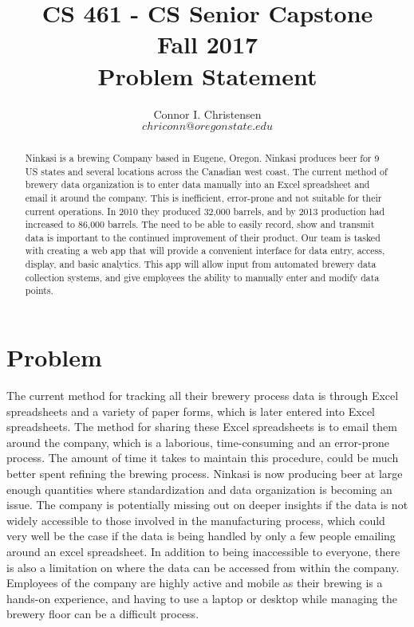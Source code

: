 \documentclass[draftclsnofoot,onecolumn,letterpaper,10pt]{IEEEtran}
\title{CS 461 - CS Senior Capstone
	\\Fall 2017
	\\Problem Statement
}
\author{Connor I. Christensen \\ \small{\(chriconn@oregonstate.edu\)}}
\begin{document}
\begin{titlingpage}
    \maketitle
    \begin{abstract}
	Ninkasi is a brewing Company based in Eugene, Oregon. Ninkasi produces beer for 9 US states and several locations across the Canadian west coast. The current method of brewery data organization is to enter data manually into an Excel spreadsheet and email it around the company. This is inefficient, error-prone and not suitable for their current operations. In 2010 they produced 32,000 barrels, and by 2013 production had increased to 86,000 barrels. The need to be able to easily record, show and transmit data is important to the continued improvement of their product. Our team is tasked with creating a web app that will provide a convenient interface for data entry, access, display, and basic analytics. This app will allow input from automated brewery data collection systems, and give employees the ability to manually enter and modify data points.


    \end{abstract}
\end{titlingpage}

\section{Problem}

The current method for tracking all their brewery process data is through Excel spreadsheets and a variety of paper forms, which is later entered into Excel spreadsheets. The method for sharing these Excel spreadsheets is to email them around the company, which is a laborious, time-consuming and an error-prone process. The amount of time it takes to maintain this procedure, could be much better spent refining the brewing process. Ninkasi is now producing beer at large enough quantities where standardization and data organization is becoming an issue. The company is potentially missing out on deeper insights if the data is not widely accessible to those involved in the manufacturing process, which could very well be the case if the data is being handled by only a few people emailing around an excel spreadsheet. In addition to being inaccessible to everyone, there is also a limitation on where the data can be accessed from within the company. Employees of the company are highly active and mobile as their brewing is a hands-on experience, and having to use a laptop or desktop while managing the brewery floor can be a difficult process.
\end{document}
